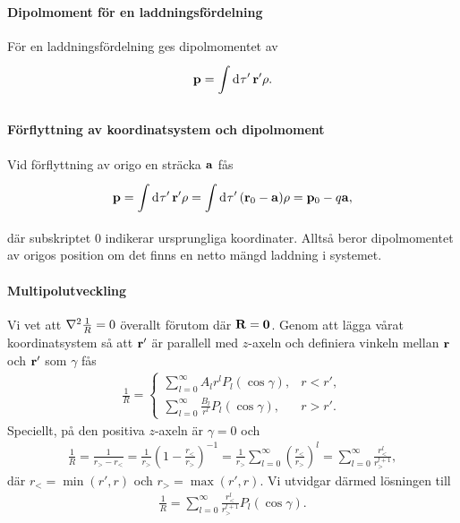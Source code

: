 \paragraph{Dipolmoment för en laddningsfördelning}
För en laddningsfördelning ges dipolmomentet av
\begin{align*}
	\vb{p} = \int\limits_{}^{}\dd[]{\tau'}\vb{r}'\rho.
\end{align*}

\paragraph{Förflyttning av koordinatsystem och dipolmoment}
Vid förflyttning av origo en sträcka $\vb{a}$ fås
\begin{align*}
	\vb{p} = \int\limits_{}^{}\dd[]{\tau'}\vb{r}'\rho = \int\limits_{}^{}\dd[]{\tau'}(\vb{r}_{0} - \vb{a})\rho = \vb{p}_{0} - q\vb{a},
\end{align*}
där subskriptet $0$ indikerar ursprungliga koordinater. Alltså beror dipolmomentet av origos position om det finns en netto mängd laddning i systemet.

\paragraph{Multipolutveckling}
Vi vet att $\laplacian{\frac{1}{R}} = 0$ överallt förutom där $\vb{R} = \vb{0}$. Genom att lägga vårat koordinatsystem så att $\vb{r}'$ är parallell med $z$-axeln och definiera vinkeln mellan $\vb{r}$ och $\vb{r}'$ som $\gamma$ fås
\begin{align*}
	\frac{1}{R} =
	\begin{cases}
		\sum\limits_{l = 0}^{\infty}A_{l}r^{l}P_{l}(\cos{\gamma}),          &r < r', \\
		\sum\limits_{l = 0}^{\infty}\frac{B_{l}}{r^{l}}P_{l}(\cos{\gamma}), &r > r'.
	\end{cases}
\end{align*}
Speciellt, på den positiva $z$-axeln är $\gamma = 0$ och
\begin{align*}
	\frac{1}{R} = \frac{1}{r_{>} - r_{<}} = \frac{1}{r_{>}}\left(1 - \frac{r_{<}}{r_{>}}\right)^{-1} = \frac{1}{r_{>}}\sum\limits_{l = 0}^{\infty}\left(\frac{r_{<}}{r_{>}}\right)^{l} = \sum\limits_{l = 0}^{\infty}\frac{r_{<}^{l}}{r_{>}^{l + 1}},
\end{align*}
där $r_{<} = \min(r', r)$ och $r_{>} = \max(r', r)$. Vi utvidgar därmed lösningen till
\begin{align*}
	\frac{1}{R} = \sum\limits_{l = 0}^{\infty}\frac{r_{<}^{l}}{r_{>}^{l + 1}}P_{l}(\cos{\gamma}).
\end{align*}

